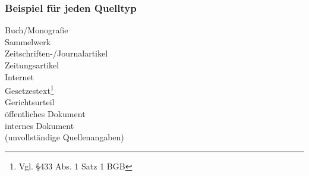 \newpage
\subsubsection{Beispiel für jeden Quelltyp}

Buch/Monografie\\
Sammelwerk\\
Zeitschriften-/Journalartikel\\
Zeitungsartikel\\
Internet\\
Gesetzestext\footnote{Vgl. §433 Abs. 1 Satz 1 BGB}\nocite{bgb}\\
Gerichtsurteil\\
öffentliches Dokument\\
internes Dokument\\%
(unvollständige Quellenangaben)

